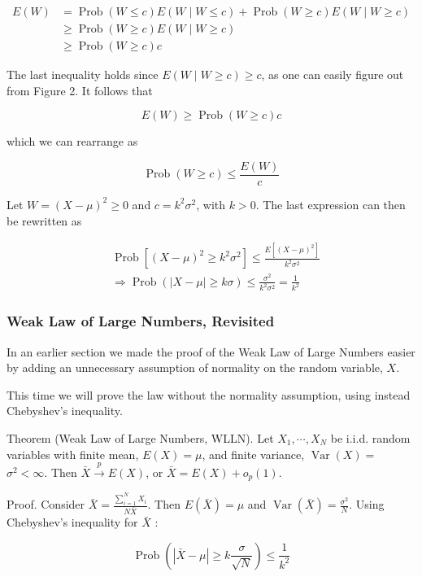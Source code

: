$$
\begin{aligned}
E(W) & =\operatorname{Prob}(W \leq c) E(W \mid W \leq c)+\operatorname{Prob}(W \geq c) E(W \mid W \geq c) \\
& \geq \operatorname{Prob}(W \geq c) E(W \mid W \geq c) \\
& \geq \operatorname{Prob}(W \geq c) c
\end{aligned}
$$

The last inequality holds since $E(W \mid W \geq c) \geq c$, as one can easily figure out from Figure 2. It follows that

$$
E(W) \geq \operatorname{Prob}(W \geq c) c
$$

which we can rearrange as

$$
\operatorname{Prob}(W \geq c) \leq \frac{E(W)}{c}
$$

Let $W=(X-\mu)^{2} \geq 0$ and $c=k^{2} \sigma^{2}$, with $k>0$. The last expression can then be rewritten as

$$
\begin{aligned}
& \operatorname{Prob}\left[(X-\mu)^{2} \geq k^{2} \sigma^{2}\right] \leq \frac{E\left[(X-\mu)^{2}\right]}{k^{2} \sigma^{2}} \\
& \Longrightarrow \operatorname{Prob}(|X-\mu| \geq k \sigma) \leq \frac{\sigma^{2}}{k^{2} \sigma^{2}}=\frac{1}{k^{2}}
\end{aligned}
$$

\subsubsection{Weak Law of Large Numbers, Revisited}
In an earlier section we made the proof of the Weak Law of Large Numbers easier by adding an unnecessary assumption of normality on the random variable, $X$.

This time we will prove the law without the normality assumption, using instead Chebyshev's inequality.

Theorem (Weak Law of Large Numbers, WLLN). Let $X_{1}, \cdots, X_{N}$ be i.i.d. random variables with finite mean, $E(X)=\mu$, and finite variance, $\operatorname{Var}(X)=$ $\sigma^{2}<\infty$. Then $\bar{X} \xrightarrow{p} E(X)$, or $\bar{X}=E(X)+o_{p}(1)$.

Proof. Consider $\bar{X}=\frac{\sum_{i=1}^{N} X_{i}}{N \bar{X}}$. Then $E(\bar{X})=\mu$ and $\operatorname{Var}(\bar{X})=\frac{\sigma^{2}}{N}$. Using Chebyshev's inequality for $\bar{X}$ :

$$
\operatorname{Prob}\left(|\bar{X}-\mu| \geq k \frac{\sigma}{\sqrt{N}}\right) \leq \frac{1}{k^{2}}
$$

